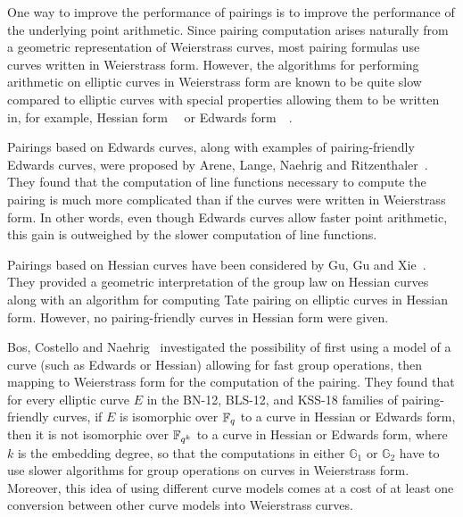 One way to improve the performance of pairings is
to improve the performance of the underlying point arithmetic.
Since pairing computation arises naturally from a geometric representation of Weierstrass curves,
most pairing formulas use curves written in Weierstrass form.
However, the algorithms for performing arithmetic on elliptic curves in Weierstrass form
are known to be quite slow compared to elliptic curves with special properties allowing them to be written in,
for example, Hessian form~\cite{2001/smart}~\cite{2001/joye} or
Edwards form~\cite{2007/edwards}~\cite{2007/bernstein-newelliptic}.

Pairings based on Edwards curves,
along with examples of pairing-friendly Edwards curves,
were proposed by Arene, Lange, Naehrig and Ritzenthaler~\cite{2009/fastertate}.
They found that the computation of line functions necessary to compute the pairing
is much more complicated than if the curves were written in Weierstrass form.
In other words,
even though Edwards curves allow faster point arithmetic,
this gain is outweighed by the slower computation of line functions.

Pairings based on Hessian curves have been considered by Gu, Gu and Xie~\cite{2010/Gu}.
They provided a geometric interpretation of the group law on Hessian curves
along with an algorithm for computing Tate pairing on elliptic curves in Hessian form.
However, no pairing-friendly curves in Hessian form were given.

Bos, Costello and Naehrig~\cite{2013/bos-pairing} investigated the possibility of first
using a model of a curve (such as Edwards or Hessian) allowing for fast group operations,
then mapping to Weierstrass form for the computation of the pairing.
They found that for every elliptic curve $E$ in the BN-12, BLS-12, and KSS-18 families of pairing-friendly curves,
if $E$ is isomorphic over $\mathbb{F}_{q}$ to a curve in Hessian or Edwards form,
then it is not isomorphic over $\mathbb{F}_{q^{k}}$ to a curve in Hessian or Edwards form,
where $k$ is the embedding degree, so that the computations in either $\mathbb{G}_1$ or $\mathbb{G}_2$
have to use slower algorithms for group operations on curves in Weierstrass form.
Moreover, this idea of using different curve models comes at a cost of at least one conversion
between other curve models into Weierstrass curves.

